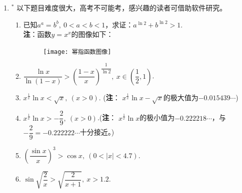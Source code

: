 \begin{enumerate}[label={\textbf{\arabic*.}},leftmargin=
    \inteval{\myenumleftmargin}pt]
\item $ ^* $ 以下题目难度很大，高考不可能考，感兴趣的读者可借助软件研究。
\begin{enumerate}[label={(\arabic*)},itemsep=-1pt]
\item 已知$ a^a=b^b,\ 0<a<b<1 $，求证：$ a^{\ln 2}+b^{\ln2}>1 $. \\
\textbf{注}：函数$ y=x^x $的图像如下：
\begin{figure}[!htbp]
    \centering
    \texttt{[image: 幂指函数图像]}
\end{figure} 
\item $ \dfrac{\ln x}{\ln(1-x)}>\left(\dfrac{1-x}{x}\right)^{
    \dfrac{1}{\ln 2}},\ x\in\left(\dfrac{1}{2},1\right) $. 
\item $ x^{\frac{1}{x}}\ln x<\sqrt{x},\ (x>0) $. (\textbf{注}：
$ x^{\frac{1}{x}}\ln x-\sqrt{x} $的极大值为$ -0.015439\cdots $) 
\item $ x^{\frac{1}{x}}\ln x >-\dfrac{2}{9},\ (x>0) $.(\textbf{注}：
$ x^{\frac{1}{x}}\ln x $的极小值为$ -0.222218\cdots $，与
$ -\dfrac{2}{9}=-0.222222\cdots $十分接近。) 
\item $ \left(\dfrac{\sin x}{x}\right)^3>\cos x,\ (0<|x|<4.7) $.
\item $ \sin\sqrt{\dfrac{2}{x}}>\sqrt{\dfrac{2}{x+1}},\ x>1.2 $.
\end{enumerate}


\end{enumerate}
